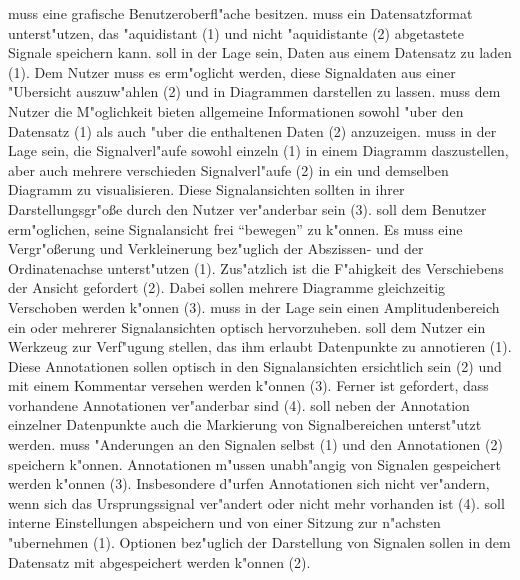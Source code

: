 \begin{enumerate}
	 muss eine grafische Benutzeroberfl"ache besitzen.
	 muss ein Datensatzformat unterst"utzen, das "aquidistant (1) und nicht "aquidistante (2) abgetastete Signale speichern kann.
	 soll in der Lage sein, Daten aus einem Datensatz zu laden (1).
						 Dem Nutzer muss es erm"oglicht werden, diese Signaldaten aus einer "Ubersicht auszuw"ahlen (2) und in Diagrammen darstellen zu lassen.
	 muss dem Nutzer die M"oglichkeit bieten allgemeine Informationen sowohl "uber den Datensatz (1) als auch "uber die enthaltenen Daten (2) anzuzeigen.
	 muss in der Lage sein, die Signalverl"aufe sowohl einzeln (1) in einem Diagramm daszustellen, aber auch mehrere verschieden Signalverl"aufe (2) in ein und demselben Diagramm zu visualisieren.
				  Diese Signalansichten sollten in ihrer Darstellungsgr"o\ss e durch den Nutzer ver"anderbar sein (3).
	 soll dem Benutzer erm"oglichen, seine Signalansicht frei "`bewegen"' zu k"onnen.
				 Es muss eine Vergr"o\ss erung und Verkleinerung bez"uglich der Abszissen- und der Ordinatenachse unterst"utzen (1).
				 Zus"atzlich ist die F"ahigkeit des Verschiebens der Ansicht gefordert (2).
				 Dabei sollen mehrere Diagramme gleichzeitig Verschoben werden k"onnen (3).
	 muss in der Lage sein einen Amplitudenbereich ein oder mehrerer Signalansichten optisch hervorzuheben.
	 soll dem Nutzer ein Werkzeug zur Verf"ugung stellen, das ihm erlaubt Datenpunkte zu annotieren (1).
					  Diese Annotationen sollen optisch in den Signalansichten ersichtlich sein (2) und mit einem Kommentar versehen werden k"onnen (3).
				  	  Ferner ist gefordert, dass vorhandene Annotationen ver"anderbar sind (4).
	 soll neben der Annotation einzelner Datenpunkte auch die Markierung von Signalbereichen unterst"utzt werden.
	 muss "Anderungen an den Signalen selbst (1) und den Annotationen (2) speichern k"onnen.
			Annotationen m"ussen unabh"angig von Signalen gespeichert werden k"onnen (3).
			Insbesondere d"urfen Annotationen sich nicht ver"andern, wenn sich das Ursprungssignal ver"andert oder nicht mehr vorhanden ist (4).
	 soll interne Einstellungen abspeichern und von einer Sitzung zur n"achsten "ubernehmen (1).
					   Optionen bez"uglich der Darstellung von Signalen sollen in dem Datensatz mit abgespeichert werden k"onnen (2).
\end{enumerate}

